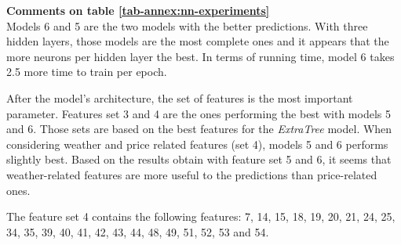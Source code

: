 \noindent\textbf{Comments on table \ref{tab-annex:nn-experiments}}\\
\indent Models 6 and 5 are the two models with the better predictions. With three hidden layers, those models are the most complete ones and it appears that the more neurons per hidden layer the best. In terms of running time, model 6 takes 2.5 more time to train per epoch.

After the model's architecture, the set of features is the most important parameter. Features set 3 and 4 are the ones performing the best with models 5 and 6. Those sets are based on the best features for the \textit{ExtraTree} model. When considering weather and price related features (set 4), models 5 and 6 performs slightly best. Based on the results obtain with feature set 5 and 6, it seems that weather-related features are more useful to the predictions than price-related ones.

The feature set 4 contains the following features: 7, 14, 15, 18, 19, 20, 21, 24, 25, 34, 35, 39, 40, 41, 42, 43, 44, 48, 49, 51, 52, 53 and 54.


